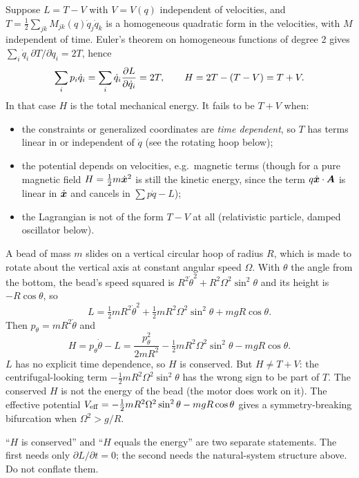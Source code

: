 \documentclass[11pt]{article}
\begin{document}
Suppose $L=T-V$ with $V=V(q)$ independent of velocities, and $T=\tfrac12\sum_{jk}M_{jk}(q)\dot q_j\dot q_k$ is a homogeneous quadratic form in the velocities, with $M$ independent of time. Euler's theorem on homogeneous functions of degree 2 gives $\sum_i\dot q_i\,\partial T/\partial\dot q_i=2T$, hence
\begin{equation}
 \sum_ip_i\dot q_i=\sum_i\dot q_i\frac{\partial L}{\partial \dot q_i}=2T,\qquad H=2T-(T-V)=T+V .
\end{equation}
In that case $H$ is the total mechanical energy. It fails to be $T+V$ when:
\begin{itemize}
 \item the constraints or generalized coordinates are \emph{time dependent}, so $T$ has terms linear in or independent of $\dot q$ (see the rotating hoop below);
 \item the potential depends on velocities, e.g.\ magnetic terms (though for a pure magnetic field $H=\tfrac12m\dot{\bm{x}}^2$ is still the kinetic energy, since the term $q\dot{\bm{x}}\cdot\bm{A}$ is linear in $\dot{\bm{x}}$ and cancels in $\sum p\dot q-L$);
 \item the Lagrangian is not of the form $T-V$ at all (relativistic particle, damped oscillator below).
\end{itemize}

\begin{example}
A bead of mass $m$ slides on a vertical circular hoop of radius $R$, which is made to rotate about the vertical axis at constant angular speed $\Omega$. With $\theta$ the angle from the bottom, the bead's speed squared is $R^2\dot\theta^2+R^2\Omega^2\sin^2\theta$ and its height is $-R\cos\theta$, so
\[
 L=\tfrac12mR^2\dot\theta^2+\tfrac12mR^2\Omega^2\sin^2\theta+mgR\cos\theta .
\]
Then $p_\theta=mR^2\dot\theta$ and
\[
 H=p_\theta\dot\theta-L=\frac{p_\theta^2}{2mR^2}-\tfrac12mR^2\Omega^2\sin^2\theta-mgR\cos\theta .
\]
$L$ has no explicit time dependence, so $H$ is conserved. But $H\neq T+V$: the centrifugal-looking term $-\tfrac12mR^2\Omega^2\sin^2\theta$ has the wrong sign to be part of $T$. The conserved $H$ is not the energy of the bead (the motor does work on it). The effective potential $V_{\rm eff}=-\tfrac12mR^2\Omega^2\sin^2\theta-mgR\cos\theta$ gives a symmetry-breaking bifurcation when $\Omega^2>g/R$.
\end{example}

\begin{pitfall}
``$H$ is conserved'' and ``$H$ equals the energy'' are two separate statements. The first needs only $\partial L/\partial t=0$; the second needs the natural-system structure above. Do not conflate them.
\end{pitfall}
\end{document}
